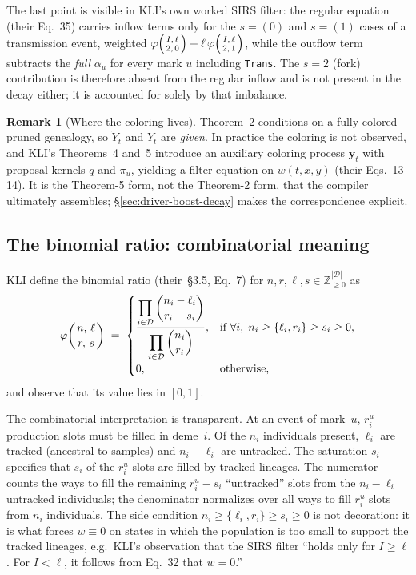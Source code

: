 \documentclass[11pt,leqno]{article}
\newcommand{\yr}{\mathbf{y}}        %
\newcommand{\Demes}{\mathcal{D}}    %
\newcommand{\Zp}{\mathbb{Z}_{\ge 0}}
\newcommand{\binratio}[4]{\varphi\!\left(\genfrac{}{}{0pt}{}{#1,\,#2}{#3,\,#4}\right)}
\newcommand{\code}[1]{\texttt{#1}}
\theoremstyle{plain}
\theoremstyle{definition}
\newtheorem{remark}[theorem]{Remark}
\begin{document}
The last point is visible in KLI's own worked SIRS filter: the regular
equation (their Eq.~35) carries inflow terms only for the $s = (0)$ and
$s = (1)$ cases of a transmission event, weighted
$\binratio{I}{\ell}{2}{0} + \ell\,\binratio{I}{\ell}{2}{1}$, while
the outflow term subtracts the \emph{full} $\alpha_u$ for every mark
$u$ including \code{Trans}.  The $s = 2$ (fork) contribution is
therefore absent from the regular inflow and is not present in the
decay either; it is accounted for solely by that imbalance.

\begin{remark}[Where the coloring lives]
Theorem~2 conditions on a fully colored pruned genealogy, so
$\tilde{Y}_t$ and $Y_t$ are \emph{given}.  In practice the coloring is
not observed, and KLI's Theorems~4 and~5 introduce an auxiliary
coloring process $\yr_t$ with proposal kernels $q$ and $\pi_u$,
yielding a filter equation on $w(t,x,y)$ (their Eqs.~13--14).  It is
the Theorem-5 form, not the Theorem-2 form, that the compiler
ultimately assembles; \S\ref{sec:driver-boost-decay} makes the
correspondence explicit.
\end{remark}

\subsection{The binomial ratio: combinatorial meaning}

KLI define the binomial ratio (their~\S3.5, Eq.~7) for
$n, r, \ell, s \in \Zp^{|\Demes|}$ as
\begin{equation}\label{eq:binratio-def}
  \binratio{n}{\ell}{r}{s} \;=\;
  \begin{cases}
    \dfrac{\displaystyle\prod_{i \in \Demes}
      \binom{n_i - \ell_i}{r_i - s_i}}
      {\displaystyle\prod_{i \in \Demes} \binom{n_i}{r_i}},
      & \text{if } \forall i,\;
        n_i \ge \{\ell_i, r_i\} \ge s_i \ge 0,\\[10pt]
    0, & \text{otherwise,}
  \end{cases}
\end{equation}
and observe that its value lies in $[0,1]$.

The combinatorial interpretation is transparent.  At an event of
mark~$u$, $r^u_i$ production slots must be filled in deme~$i$.  Of the
$n_i$ individuals present, $\ell_i$ are tracked (ancestral to samples)
and $n_i - \ell_i$ are untracked.  The saturation $s_i$ specifies that
$s_i$ of the $r^u_i$ slots are filled by tracked lineages.  The
numerator counts the ways to fill the remaining $r^u_i - s_i$
``untracked'' slots from the $n_i - \ell_i$ untracked individuals; the
denominator normalizes over all ways to fill $r^u_i$ slots from $n_i$
individuals.  The side condition
$n_i \ge \{\ell_i, r_i\} \ge s_i \ge 0$ is not decoration: it is what
forces $w \equiv 0$ on states in which the population is too small to
support the tracked lineages, e.g.\ KLI's observation that the SIRS
filter ``holds only for $I \ge \ell$.  For $I < \ell$, it follows from
Eq.~32 that $w = 0$.''
\end{document}

